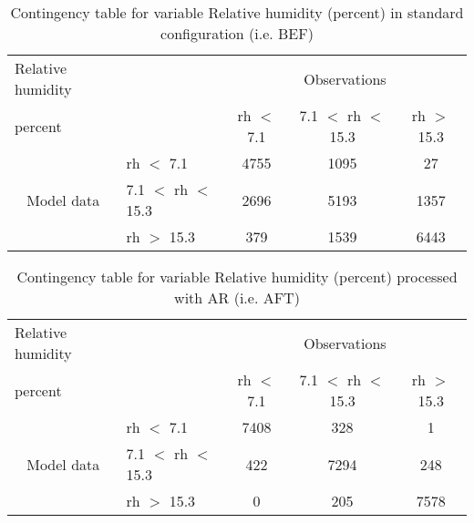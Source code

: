 \documentclass[11pt,english]{article}
\begin{document}
\begin{table}[]
\begin{center}
\begin{tabular}{llccc}
\hline
{Relative humidity}                                       &                                                    & \multicolumn{3}{c}{Observations}                 \\
{percent}                                       &                             & rh $<$ 7.1   & 7.1 $<$ rh $<$ 15.3 & rh $>$ 15.3 \\
\hline
\multicolumn{1}{c}{\multirow{3}{*}{Model data}}  & rh $<$ 7.1             & 4755                & 1095                       & 27              \\
                                                 & 7.1  $<$ rh $<$ 15.3 & 2696                & 5193                       & 1357              \\
                                                 & rh $>$ 15.3             & 379                & 1539                       & 6443              \\
\hline
\end{tabular}
\end{center}
\caption{Contingency table for variable Relative humidity (percent) in standard configuration (i.e. BEF)}
\label{tab:contingencyrhBEF}
\end{table}
\begin{table}[]
\begin{center}
\begin{tabular}{llccc}
\hline
{Relative humidity}                                       &                                                    & \multicolumn{3}{c}{Observations}                 \\
{percent}                                       &                             & rh $<$ 7.1   & 7.1 $<$ rh $<$ 15.3 & rh $>$ 15.3 \\
\hline
\multicolumn{1}{c}{\multirow{3}{*}{Model data}}  & rh $<$ 7.1             & 7408                & 328                       & 1              \\
                                                 & 7.1  $<$ rh $<$ 15.3 & 422                & 7294                       & 248              \\
                                                 & rh $>$ 15.3             & 0                & 205                       & 7578              \\
\hline
\end{tabular}
\end{center}
\caption{Contingency table for variable Relative humidity (percent) processed with AR (i.e. AFT)}
\label{tab:contingencyrhAFT}
\end{table}
\end{document}
